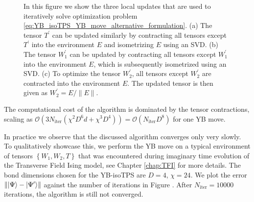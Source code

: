 \begin{figure}
\begin{subfigure}[c]{0.85\textwidth}
		\caption{}\label{fig:YB_move_iterate_polar_optimize_W2}
	\end{subfigure}%
	\caption{In this figure we show the three local updates that are used to iteratively solve optimization problem \eqref{eq:YB_isoTPS_YB_move_alternative_formulation}. (a) The tensor $T^\prime$ can be updated similarly by contracting all tensors except $T^\prime$ into the environment $E$ and isometrizing $E$ using an SVD. (b) The tensor $W_1^\prime$ can be updated by contracting all tensors except $W_1^\prime$ into the environment $E$, which is subsequently isometrized using an SVD. (c) To optimize the tensor $W_2^\prime$, all tensors except $W_2^\prime$ are contracted into the environment $E$. The updated tensor is then given as $W_2^\prime = E/\lVert E\rVert$.}
	\label{fig:YB_move_iterate_polar}
\end{figure}
The computational cost of the algorithm is dominated by the tensor contractions, scaling as $\mathcal{O}(3N_\text{iter}(\chi^2D^6d + \chi^3D^4)) = \mathcal{O}(N_\text{iter}D^8)$ for one YB move.\par

In practice we observe that the discussed algorithm converges only very slowly. To qualitatively showcase this, we perform the YB move on a typical environment of tensors $\left\{W_1, W_2, T\right\}$ that was encountered during imaginary time evolution of the Transverse Field Ising model, see Chapter \ref{chap:TFI} for more details. The bond dimensions chosen for the YB-isoTPS are $D = 4$, $\chi = 24$. We plot the error $\lVert\ket{\Psi}-\ket{\Psi^\prime}\rVert$ against the number of iterations in Figure . After $N_\text{iter}=10000$ iterations, the algorithm is still not converged.